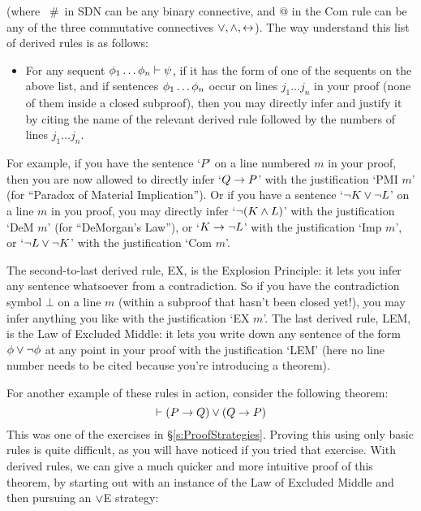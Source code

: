 \noindent (where  \ \#\  in SDN can be any binary connective, and $@$ in the Com rule can be any of the three commutative connectives $\vee, \wedge, \leftrightarrow$).  The way understand this list of derived rules is as follows:

\begin{itemize}
\item For any sequent $\mathcal{\phi}_1 \ldots \mathcal{\phi}_n \vdash \mathcal{\psi}$, if it has the form of one of the sequents on the above list, and if sentences $\mathcal{\phi}_1 \ldots \mathcal{\phi}_n$ occur on lines $j_1 \ldots j_n$ in your proof (none of them inside a closed subproof), then you may directly infer \meta{\chi} and justify it by citing the name of the relevant derived rule followed by the numbers of lines $j_1 \ldots j_n$.
\end{itemize}
For example, if you have the sentence `$P$' on a line numbered $m$ in your proof, then you are now allowed to directly infer `$Q \rightarrow P$' with the justification `PMI $m$' (for ``Paradox of Material Implication'').   Or if you have a sentence `$\neg K \vee \neg L$' on a line $m$ in you proof, you may directly infer `$\neg(K \wedge L)$' with the justification `DeM $m$' (for ``DeMorgan's Law''), or `$K \rightarrow \neg L$' with the justification `Imp $m$', or `$\neg L \vee \neg K$' with the justification `Com $m$'.

The second-to-last derived rule, EX, is the Explosion Principle: it lets you infer any sentence whatsoever from a contradiction.  So if you have the contradiction symbol $\bot$ on a line $m$ (within a subproof that hasn't been closed yet!), you may infer anything you like with the justification `EX $m$'.  The last derived rule, LEM, is the Law of Excluded Middle: it lets you write down any sentence of the form $\mathcal{\phi} \vee \neg \mathcal{\phi}$ at any point in your proof with the justification `LEM' (here no line number needs to be cited because you're introducing a theorem).

For another example of these rules in action, consider the following theorem:
$$\vdash (P \rightarrow Q) \vee (Q \rightarrow P)$$
This was one of the exercises in \S\ref{s:ProofStrategies}.  Proving this using only basic rules is quite difficult, as you will have noticed if you tried that exercise.  With derived rules, we can give a much quicker and more intuitive proof of this theorem, by starting out with an instance of the Law of Excluded Middle and then pursuing an $\vee$E strategy:\\


